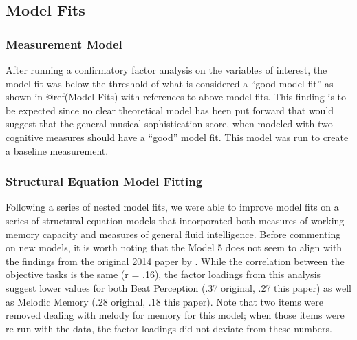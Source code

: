\documentclass[]{book}
\begin{document}
\hypertarget{model-fits}{%
\subsection{Model Fits}\label{model-fits}}

\hypertarget{measurement-model-1}{%
\subsubsection{Measurement Model}\label{measurement-model-1}}

After running a confirmatory factor analysis on the variables of interest, the model fit was below the threshold of what is considered a ``good model fit'' as shown in @ref(Model Fits) with references to above model fits.
This finding is to be expected since no clear theoretical model has been put forward that would suggest that the general musical sophistication score, when modeled with two cognitive measures should have a ``good'' model fit.
This model was run to create a baseline measurement.

\hypertarget{structural-equation-model-fitting}{%
\subsubsection{Structural Equation Model Fitting}\label{structural-equation-model-fitting}}

Following a series of nested model fits, we were able to improve model fits on a series of structural equation models that incorporated both measures of working memory capacity and measures of general fluid intelligence.
Before commenting on new models, it is worth noting that the Model 5 does not seem to align with the findings from the original 2014 paper by \citep{mullensiefenMusicalityNonMusiciansIndex2014}.
While the correlation between the objective tasks is the same (r = .16), the factor loadings from this analysis suggest lower values for both Beat Perception (.37 original, .27 this paper) as well as Melodic Memory (.28 original, .18 this paper).
Note that two items were removed dealing with melody for memory for this model; when those items were re-run with the data, the factor loadings did not deviate from these numbers.
\end{document}
